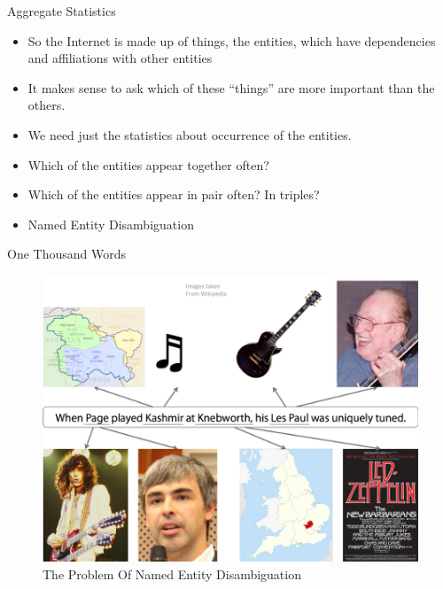 \documentclass{beamer}
\begin{document}
\begin{frame}{Aggregate Statistics}
\begin{itemize}
\item So the Internet is made up of things, the entities, which have dependencies and affiliations with other entities  \medskip
\item It makes sense to ask which of these “things” are more important than the others. \medskip
\item We need just the statistics about occurrence of the entities. \medskip
\item Which of the entities appear together often? \medskip
\item Which of the entities appear in pair often? In triples? \medskip	
\item Named Entity Disambiguation
\end{itemize}
\end{frame}


\begin{frame}

 \begin{center}
 \Huge  \color{blue}{Named Entity Disambiguation}
  
  \bigskip

  \end{center}

\end{frame}

\begin{frame}{One Thousand Words}
 \begin{figure}[h]
 \centering
 \includegraphics[bb=0 0 216 165]{./ned.png}
 \caption{The Problem Of Named Entity Disambiguation}
\end{figure}

\end{frame}
\end{document}
